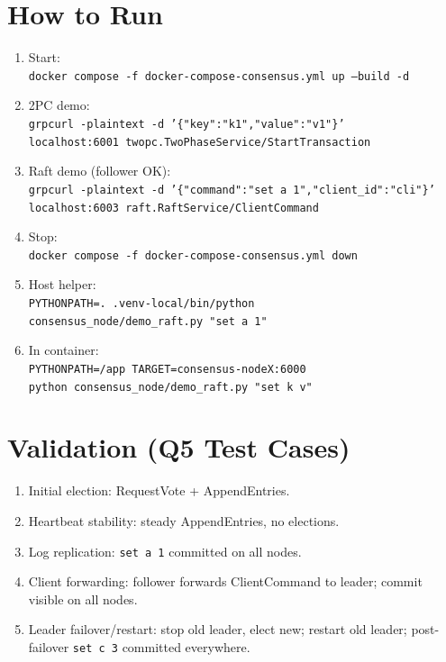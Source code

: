 \documentclass[11pt]{article}
\begin{document}
\section*{How to Run}
\begin{enumerate}[leftmargin=*]
  \item Start:\\ \texttt{docker compose -f docker-compose-consensus.yml up --build -d}
  \item 2PC demo:\\ \texttt{grpcurl -plaintext -d '\{"key":"k1","value":"v1"\}'}\\ \texttt{localhost:6001 twopc.TwoPhaseService/StartTransaction}
  \item Raft demo (follower OK):\\ \texttt{grpcurl -plaintext -d '\{"command":"set a 1","client\_id":"cli"\}'}\\ \texttt{localhost:6003 raft.RaftService/ClientCommand}
  \item Stop:\\ \texttt{docker compose -f docker-compose-consensus.yml down}
  \item Host helper:\\ \texttt{PYTHONPATH=. .venv-local/bin/python}\\ \texttt{consensus\_node/demo\_raft.py "set a 1"}
  \item In container:\\ \texttt{PYTHONPATH=/app TARGET=consensus-nodeX:6000}\\ \texttt{python consensus\_node/demo\_raft.py "set k v"}
\end{enumerate}

\section*{Validation (Q5 Test Cases)}
\begin{enumerate}[leftmargin=*]
  \item Initial election: RequestVote + AppendEntries.
  \item Heartbeat stability: steady AppendEntries, no elections.
  \item Log replication: \texttt{set a 1} committed on all nodes.
  \item Client forwarding: follower forwards ClientCommand to leader; commit visible on all nodes.
  \item Leader failover/restart: stop old leader, elect new; restart old leader; post-failover \texttt{set c 3} committed everywhere.
\end{enumerate}
\end{document}

